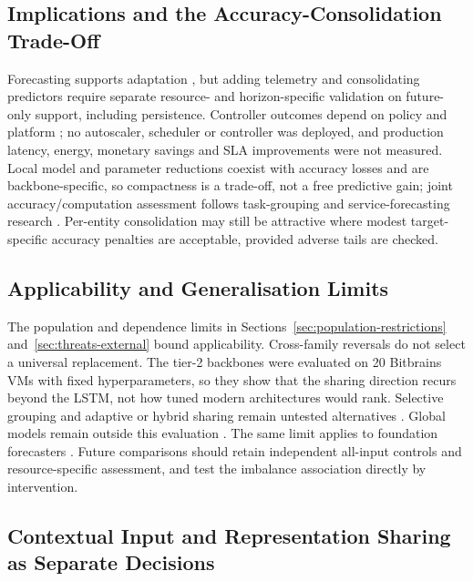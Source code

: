 \documentclass[5p,twocolumn]{elsarticle}
\begin{document}
\subsection{Implications and the Accuracy-Consolidation Trade-Off}
\label{sec:discussion-systems}
\label{sec:discussion-efficiency}

Forecasting supports adaptation
\citep{Taherizadeh2018Monitoring,Bauer2020SelfAware}, but adding telemetry and
consolidating predictors require separate resource- and horizon-specific
validation on future-only support, including persistence. Controller outcomes
depend on policy and platform \citep{Qu2018Autoscaling}; no autoscaler,
scheduler or controller was deployed, and production latency, energy,
monetary savings and SLA improvements were not measured. Local model and
parameter reductions coexist with accuracy losses and are backbone-specific,
so compactness is a trade-off, not a free predictive gain; joint
accuracy/computation assessment follows task-grouping and service-forecasting
research \citep{Standley2020TaskGrouping,Syu2017DynamicQoS}. Per-entity
consolidation may still be attractive where modest target-specific accuracy
penalties are acceptable, provided adverse tails are checked.

\subsection{Applicability and Generalisation Limits}
\label{sec:discussion-applicability}

The population and dependence limits in Sections~\ref{sec:population-restrictions}
and~\ref{sec:threats-external} bound applicability. Cross-family reversals do not
select a universal replacement. The tier-2 backbones were evaluated on 20
Bitbrains VMs with fixed hyperparameters, so they show that the sharing
direction recurs beyond the LSTM, not how tuned modern architectures would
rank. Selective grouping and adaptive or hybrid sharing remain untested
alternatives
\citep{Fifty2021TaskGroupings,Yu2020GradientSurgery,Nochumsohn2025MTLinear}.
Global models remain outside this evaluation
\citep{MonteroManso2021GlobalForecasting}.
The same limit applies to foundation forecasters
\citep{DiMenna2026RuntimeForecasting}. Future comparisons should retain
independent all-input controls and resource-specific assessment, and test
the imbalance association directly by intervention.

\subsection{Contextual Input and Representation Sharing as Separate Decisions}
\label{sec:discussion-separability}
\end{document}
